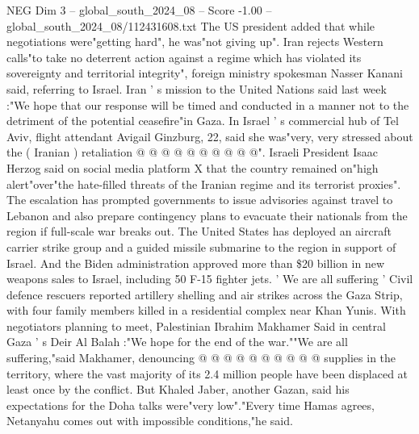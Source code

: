 \begin{textsample}{NEG Dim 3 – global\_south\_2024\_08 – Score -1.00 – global\_south\_2024\_08/112431608.txt}
The US president added that while negotiations were"getting hard", he was"not giving up".
Iran rejects Western calls"to take no deterrent action against a regime which has violated its sovereignty and territorial integrity", foreign ministry spokesman Nasser Kanani said, referring to Israel.
Iran ' s mission to the United Nations said last week :"We hope that our response will be timed and conducted in a manner not to the detriment of the potential ceasefire"in Gaza.
In Israel ' s commercial hub of Tel Aviv, flight attendant Avigail Ginzburg, 22, said she was"very, very stressed about the ( Iranian ) retaliation @ @ @ @ @ @ @ @ @ @".
Israeli President Isaac Herzog said on social media platform X that the country remained on"high alert"over"the hate-filled threats of the Iranian regime and its terrorist proxies".
The escalation has prompted governments to issue advisories against travel to Lebanon and also prepare contingency plans to evacuate their nationals from the region if full-scale war breaks out.
The United States has deployed an aircraft carrier strike group and a guided missile submarine to the region in support of Israel.
And the Biden administration approved more than \$20 billion in new weapons sales to Israel, including 50 F-15 fighter jets. ' We are all suffering ' Civil defence rescuers reported artillery shelling and air strikes across the Gaza Strip, with four family members killed in a residential complex near Khan Yunis.
With negotiators planning to meet, Palestinian Ibrahim Makhamer Said in central Gaza ' s Deir Al Balah :"We hope for the end of the war.""We are all suffering,"said Makhamer, denouncing @ @ @ @ @ @ @ @ @ @ supplies in the territory, where the vast majority of its 2.4 million people have been displaced at least once by the conflict.
But Khaled Jaber, another Gazan, said his expectations for the Doha talks were"very low"."Every time Hamas agrees, Netanyahu comes out with impossible conditions,"he said.

\end{textsample}
